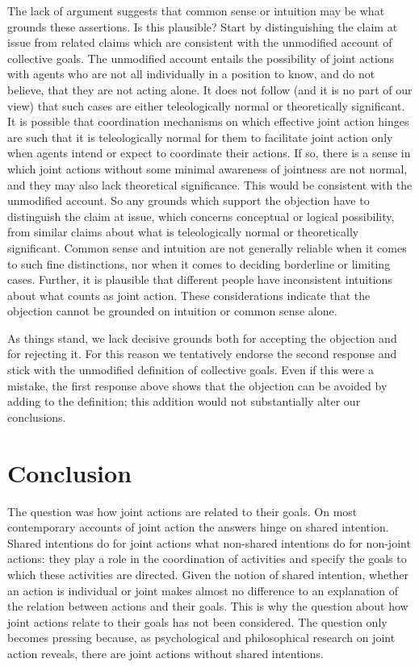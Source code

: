 \documentclass[12pt,a4paper]{extarticle}
\begin{document}
The lack of argument suggests that common sense or intuition may be what grounds these assertions.
Is this plausible?
Start by distinguishing the claim at issue from related claims which are consistent with the unmodified account of collective goals.
The unmodified account entails the possibility of joint actions with agents who are not all individually in a position to know, and do not believe, that they are not acting alone.
It does not follow (and it is no part of our view) that such cases are either teleologically normal or theoretically significant.
It is possible that coordination mechanisms on which effective joint action hinges are such that it is teleologically normal for them to facilitate joint action only when agents intend or expect to coordinate their actions.
If so, there is a sense in which joint actions without some minimal awareness of jointness are not normal, and they may also lack theoretical significance.
This would be consistent with the unmodified account.
So any grounds which support the objection have to distinguish the claim at issue, which concerns conceptual or logical possibility, from similar claims about what is teleologically normal or theoretically significant.  
Common sense and intuition are not generally reliable when it comes to such fine distinctions, nor when it comes to deciding borderline or limiting cases.
Further, it is plausible that different people have inconsistent intuitions about what counts as joint action.
These considerations indicate that the objection cannot be grounded on intuition or common sense alone.

As things stand, we lack decisive grounds both for accepting the objection and for rejecting it.
For this reason we tentatively endorse the second response and stick with the unmodified definition of collective goals.
Even if this were a mistake, the first response above shows that the objection can be avoided by adding to the definition; this addition would not substantially alter our conclusions.


\section{Conclusion}

The question was how joint actions are related to their goals.
On most contemporary accounts of joint action the answers hinge on shared intention.
Shared intentions do  for joint actions what non-shared intentions do for non-joint actions: they play a role in the coordination of activities and specify the goals to which these activities are directed.
Given the notion of shared intention, whether an action is individual or joint makes almost no difference to an explanation of  the relation between actions and their goals.
This is why the question about how  joint actions relate to their goals has not been considered.  
The question only becomes pressing because, as psychological and philosophical research on joint action reveals, there are joint actions without shared intentions.
\end{document}
